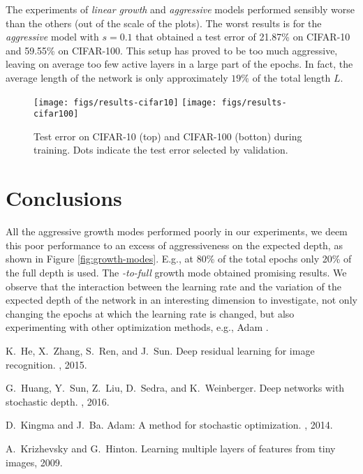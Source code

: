 \documentclass{sig-alternate}
\begin{document}
The experiments of \emph{linear growth} and \emph{aggressive} models performed sensibly worse than the others (out of the scale of the plots).
The worst results is for the \emph{aggressive} model with $s=0.1$ that obtained a test error of 21.87\% on CIFAR-10 and 59.55\% on CIFAR-100.
This setup has proved to be too much aggressive, leaving on average too few active layers in a large part of the epochs. 
In fact, the average length of the network is only approximately $19\%$ of the total length $L$.

\begin{figure*}[t!]
\begin{center}
\texttt{[image: figs/results-cifar10]}
\texttt{[image: figs/results-cifar100]}%
\end{center}
\label{fig:results10}
\vspace{-5ex}\caption{Test error on CIFAR-10 (top) and CIFAR-100 (botton) during training. Dots indicate the test error selected by validation.}
\end{figure*}

\section{Conclusions}
All the aggressive growth modes performed poorly in our experiments, we deem this poor performance to an excess of aggressiveness on the expected depth, as shown in Figure \ref{fig:growth-modes}. 
E.g., at 80\% of the total epochs only 20\% of the full depth is used.
The \emph{\cite{huang2016deep}-to-full} growth mode obtained promising results.
We observe that the interaction between the learning rate and the variation of the expected depth of the network in an interesting dimension to investigate, not only changing the epochs at which the learning rate is changed, but also experimenting with other optimization methods, e.g., Adam \cite{adam}.



\begin{thebibliography}{1}

K.~He, X.~Zhang, S.~Ren, and J.~Sun.
\newblock Deep residual learning for image recognition.
, 2015.

G.~Huang, Y.~Sun, Z.~Liu, D.~Sedra, and K.~Weinberger.
\newblock Deep networks with stochastic depth.
, 2016.

D.~Kingma and J.~Ba.
\newblock Adam: A method for stochastic optimization.
, 2014.

A.~Krizhevsky and G.~Hinton.
\newblock Learning multiple layers of features from tiny images, 2009.

\end{thebibliography}
\end{document}
